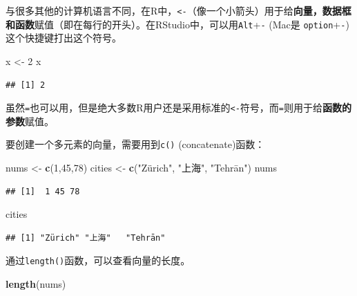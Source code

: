 \documentclass[]{book}
\newenvironment{Shaded}{\begin{snugshade}}{\end{snugshade}}
\newcommand{\DecValTok}[1]{\textcolor[rgb]{0.00,0.00,0.81}{#1}}
\newcommand{\KeywordTok}[1]{\textcolor[rgb]{0.13,0.29,0.53}{\textbf{#1}}}
\newcommand{\NormalTok}[1]{#1}
\newcommand{\StringTok}[1]{\textcolor[rgb]{0.31,0.60,0.02}{#1}}
\begin{document}
与很多其他的计算机语言不同，在R中，\texttt{\textless{}-}（像一个小箭头）用于给\textbf{向量，数据框和函数}赋值（即在每行的开头）。在RStudio中，可以用\texttt{Alt}+\texttt{-} (Mac是 \texttt{option}+\texttt{-}) 这个快捷键打出这个符号。

\begin{Shaded}
\begin{Highlighting}[]
\NormalTok{x <-}\StringTok{ }\DecValTok{2}
\NormalTok{x}
\end{Highlighting}
\end{Shaded}

\begin{verbatim}
## [1] 2
\end{verbatim}

虽然\texttt{=}也可以用，但是绝大多数R用户还是采用标准的\texttt{\textless{}-}符号，而\texttt{=}则用于给\textbf{函数的参数}赋值。

要创建一个多元素的向量，需要用到\texttt{c()} (concatenate)函数：

\begin{Shaded}
\begin{Highlighting}[]
\NormalTok{nums <-}\StringTok{ }\KeywordTok{c}\NormalTok{(}\DecValTok{1}\NormalTok{,}\DecValTok{45}\NormalTok{,}\DecValTok{78}\NormalTok{)}
\NormalTok{cities <-}\StringTok{ }\KeywordTok{c}\NormalTok{(}\StringTok{"Zürich", "}\NormalTok{上海}\StringTok{", "}\NormalTok{Tehrān}\StringTok{")}
\StringTok{nums}
\end{Highlighting}
\end{Shaded}

\begin{verbatim}
## [1]  1 45 78
\end{verbatim}

\begin{Shaded}
\begin{Highlighting}[]
\NormalTok{cities}
\end{Highlighting}
\end{Shaded}

\begin{verbatim}
## [1] "Zürich" "上海"   "Tehrān"
\end{verbatim}

通过\texttt{length()}函数，可以查看向量的长度。

\begin{Shaded}
\begin{Highlighting}[]
\KeywordTok{length}\NormalTok{(nums)}
\end{Highlighting}
\end{Shaded}
\end{document}
